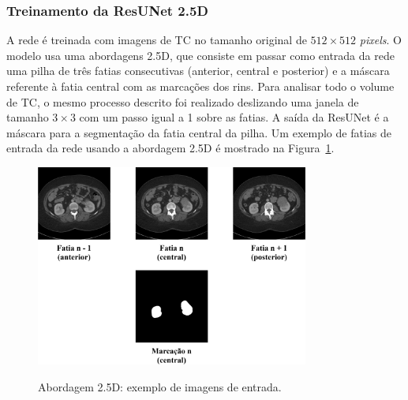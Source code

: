 

\subsubsection{Treinamento da ResUNet 2.5D}
\label{sec:treinamento-ResUNet}

A rede é treinada com imagens de TC no tamanho original de $512\times512$ \textit{pixels}. O modelo usa uma abordagens 2.5D, que consiste em passar como entrada da rede uma pilha de três fatias consecutivas (anterior, central e posterior) e a máscara referente à fatia central com as marcações dos rins. Para analisar todo o volume de TC, o mesmo processo descrito foi realizado deslizando uma janela de tamanho $3\times3$ com um passo igual a 1 sobre as fatias. A saída da ResUNet é a máscara para a segmentação da fatia central da pilha. Um exemplo de fatias de entrada da rede usando a abordagem 2.5D é mostrado na Figura~\ref{fig:abordagem-2.5D}.


\begin{figure}[!ht]
    \centering
    \caption{Abordagem 2.5D: exemplo de imagens de entrada.}
    \includegraphics[width=0.8\textwidth]{figuras/abordagem-2.5D-entrada.png}
    \label{fig:abordagem-2.5D}
\end{figure}

